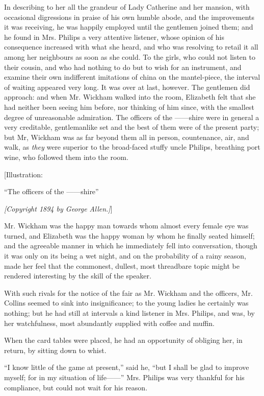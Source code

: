 \documentclass[12pt]{book}
\begin{document}
In describing to her all the grandeur of Lady Catherine and her mansion, with occasional digressions in praise of his own humble abode, and the improvements it was receiving, he was happily employed until the gentlemen joined them; and he found in Mrs. Philips a very attentive listener, whose opinion of his consequence increased with what she heard, and who was resolving to retail it all among her neighbours as soon as she could. To the girls, who could not listen to their cousin, and who had nothing to do but to wish for an instrument, and examine their own indifferent imitations of china on the mantel-piece, the interval of waiting appeared very long. It was over at last, however. The gentlemen did approach: and when Mr. Wickham walked into the room, Elizabeth felt that she had neither been seeing him before, nor thinking of him since, with the smallest degree of unreasonable admiration. The officers of the ------shire were in general a very creditable, gentlemanlike set and the best of them were of the present party; but Mr, Wickham was as far beyond them all in person, countenance, air, and walk, as \textit{they} were superior to the broad-faced stuffy uncle Philips, breathing port wine, who followed them into the room.

[Illustration:

``The officers of the ------shire''

\emph{[\textit{Copyright 1894 by George Allen.}]}]

Mr. Wickham was the happy man towards whom almost every female eye was turned, and Elizabeth was the happy woman by whom he finally seated himself; and the agreeable manner in which he immediately fell into conversation, though it was only on its being a wet night, and on the probability of a rainy season, made her feel that the commonest, dullest, most threadbare topic might be rendered interesting by the skill of the speaker.

With such rivals for the notice of the fair as Mr. Wickham and the officers, Mr. Collins seemed to sink into insignificance; to the young ladies he certainly was nothing; but he had still at intervals a kind listener in Mrs. Philips, and was, by her watchfulness, most abundantly supplied with coffee and muffin.

When the card tables were placed, he had an opportunity of obliging her, in return, by sitting down to whist.

``I know little of the game at present,'' said he, ``but I shall be glad to improve myself; for in my situation of life------'' Mrs. Philips was very thankful for his compliance, but could not wait for his reason.
\end{document}
